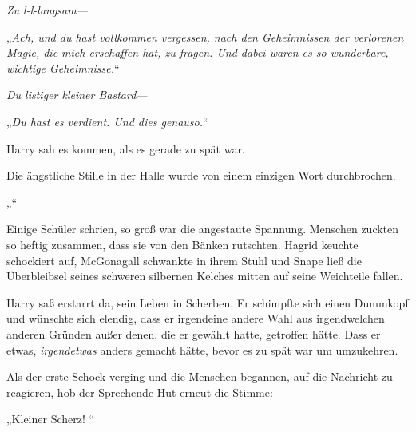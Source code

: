 \emph{Zu l-l-langsam—}

„\emph{Ach, und du hast vollkommen vergessen, nach den Geheimnissen der verlorenen Magie, die mich erschaffen hat, zu fragen. Und dabei waren es so wunderbare, wichtige Geheimnisse.}“

\emph{Du listiger kleiner \emph{Bastard}—}

„\emph{Du hast es verdient. Und dies genauso.}“

Harry sah es kommen, als es gerade zu spät war.

Die ängstliche Stille in der Halle wurde von einem einzigen Wort durchbrochen.

„“

Einige Schüler schrien, so groß war die angestaute Spannung. Menschen zuckten so heftig zusammen, dass sie von den Bänken rutschten. Hagrid keuchte schockiert auf, McGonagall schwankte in ihrem Stuhl und Snape ließ die Überbleibsel seines schweren silbernen Kelches mitten auf seine Weichteile fallen.

Harry saß erstarrt da, sein Leben in Scherben. Er schimpfte sich einen Dummkopf und wünschte sich elendig, dass er irgendeine andere Wahl aus irgendwelchen anderen Gründen außer denen, die er gewählt hatte, getroffen hätte. Dass er etwas, \emph{irgendetwas} anders gemacht hätte, bevor es zu spät war um umzukehren.

Als der erste Schock verging und die Menschen begannen, auf die Nachricht zu reagieren, hob der Sprechende Hut erneut die Stimme:

„Kleiner Scherz! “

